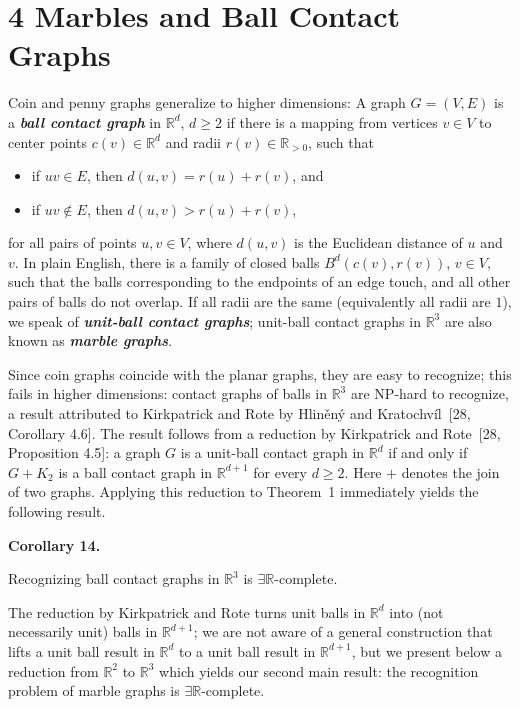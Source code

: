 \documentclass{article}
\newcommand{\defn}[1]{\textit{\textbf{\boldmath #1}}}
\begin{document}
\section*{4 Marbles and Ball Contact Graphs}

Coin and penny graphs generalize to higher dimensions: A graph $G = (V,E)$ is a \defn{ball contact graph} in $\ensuremath{\mathbb{R}}^d$, $d\geq 2$ if 
there is a mapping from vertices $v \in V$ to center points 
$c(v) \in \ensuremath{\mathbb{R}}^d$ and radii 
$r(v) \in \ensuremath{\mathbb{R}}_{>0}$,
such that 
\begin{itemize}
    \item if $uv \in E$, then $d(u,v) = r(u)+r(v)$, and
    \item if $uv \not\in E$, then $d(u,v)>r(u)+r(v)$,
\end{itemize}
for all pairs of points $u,v \in V$, where $d(u,v)$ is the Euclidean distance of $u$ and $v$.
 In plain English, there is a family of closed balls $B^d(c(v),r(v))$, $v \in V$, such that the balls corresponding to the endpoints of an edge touch, and all other pairs of balls do not overlap. If all radii are the same (equivalently all radii are $1$), we speak of \defn{unit-ball contact graphs}; unit-ball contact graphs in $\ensuremath{\mathbb{R}}^3$ are also known as \defn{marble graphs}. 

Since coin graphs coincide with the planar graphs, they are easy to recognize; this fails in higher dimensions: contact graphs of balls in $\ensuremath{\mathbb{R}}^3$ are \textsf{NP}-hard to recognize, a result attributed to Kirkpatrick and Rote by Hliněný and Kratochvíl~[28, Corollary 4.6]. The result follows from a reduction by Kirkpatrick and Rote~[28, Proposition 4.5]: a graph $G$ is a unit-ball contact graph in $\ensuremath{\mathbb{R}}^d$ if and only if $G + K_2$ is a ball contact graph in $\ensuremath{\mathbb{R}}^{d+1}$ for every $d \geq 2$. Here $+$ denotes the join of two graphs. Applying this reduction to Theorem~1 immediately yields the following result.

\par\medskip\noindent\textbf{Corollary 14.} \begin{itshape}
    Recognizing ball contact graphs in $\ensuremath{\mathbb{R}}^3$ is \ensuremath{\exists\mathbb{R}}-complete. 
\end{itshape}\par\medskip

The reduction by Kirkpatrick and Rote turns unit balls in $\ensuremath{\mathbb{R}}^d$  into 
(not necessarily unit)
balls in $\ensuremath{\mathbb{R}}^{d+1}$; we are not aware of a general construction that lifts a unit ball result in $\ensuremath{\mathbb{R}}^d$ to a unit ball result in $\ensuremath{\mathbb{R}}^{d+1}$, but we
present below
a reduction from $\ensuremath{\mathbb{R}}^2$ to $\ensuremath{\mathbb{R}}^3$ which yields our second main result: the recognition problem of marble graphs is \ensuremath{\exists\mathbb{R}}-complete. 
\end{document}
